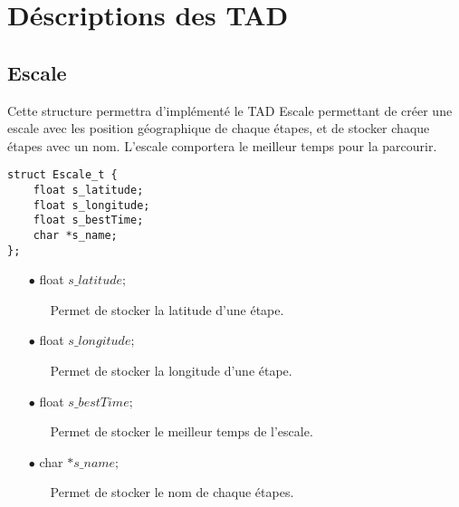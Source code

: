 \documentclass[a4paper, 11pt, oneside]{article}
\begin{document}
		\footnotetext{\textcolor{red}{Nom des opérations interne}} 
		\footnotetext{\textcolor{green}{Arguments}} 
		\footnotetext{\textcolor{blue}{Types de retour}} 
		\footnotetext{\textcolor{magenta}{Nom des opérations d'observation}}
		
	\newpage
	
\section{Déscriptions des TAD}

	\subsection{Escale}
	
	Cette structure permettra d'implémenté le TAD Escale permettant de créer une escale avec les position géographique de chaque étapes,
	et de stocker chaque étapes avec un nom.
	L'escale comportera le meilleur temps pour la parcourir.
	
		\begin{lstlisting}
struct Escale_t {
	float s_latitude;
	float s_longitude;
	float s_bestTime;
	char *s_name;
};
		\end{lstlisting}
		
		\begin{itemize}
			\item[$\bullet$] float $s\_latitude;$
			\begin{itemize}
				\item[] Permet de stocker la latitude d'une étape.
			\end{itemize}
			\item[$\bullet$] float $s\_longitude;$
			\begin{itemize}
				\item[] Permet de stocker la longitude d'une étape.
			\end{itemize}
			\item[$\bullet$] float $s\_bestTime;$
			\begin{itemize}
				\item[] Permet de stocker le meilleur temps de l'escale.
			\end{itemize}
			\item[$\bullet$] char $*s\_name;$
			\begin{itemize}
				\item[] Permet de stocker le nom de chaque étapes.
			\end{itemize}
		\end{itemize}
		
\end{document}
